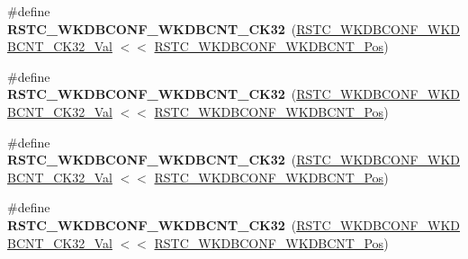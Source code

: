 \begin{DoxyCompactItemize}
\item 
\hypertarget{group___s_a_m_l21___r_s_t_c_ga48db58fd088481bbd3b6e4c97d285c78}{}\#define {\bfseries R\+S\+T\+C\+\_\+\+W\+K\+D\+B\+C\+O\+N\+F\+\_\+\+W\+K\+D\+B\+C\+N\+T\+\_\+C\+K32}~(\hyperlink{group___s_a_m_l21___r_s_t_c_gaa2aeafab04946b75150126bfb34a50db}{R\+S\+T\+C\+\_\+\+W\+K\+D\+B\+C\+O\+N\+F\+\_\+\+W\+K\+D\+B\+C\+N\+T\+\_\+C\+K32\+\_\+\+Val} $<$$<$ \hyperlink{group___s_a_m_l21___r_s_t_c_ga04802a267786aed951e1e31ab54ce6ad}{R\+S\+T\+C\+\_\+\+W\+K\+D\+B\+C\+O\+N\+F\+\_\+\+W\+K\+D\+B\+C\+N\+T\+\_\+\+Pos})\label{group___s_a_m_l21___r_s_t_c_ga48db58fd088481bbd3b6e4c97d285c78}

\item 
\hypertarget{group___s_a_m_l21___r_s_t_c_ga2f316556bdc6aa61a1c677333b56bc12}{}\#define {\bfseries R\+S\+T\+C\+\_\+\+W\+K\+D\+B\+C\+O\+N\+F\+\_\+\+W\+K\+D\+B\+C\+N\+T\+\_\+C\+K32}~(\hyperlink{group___s_a_m_l21___r_s_t_c_ga2c8394abff73e05170032f4b4aa5f0d5}{R\+S\+T\+C\+\_\+\+W\+K\+D\+B\+C\+O\+N\+F\+\_\+\+W\+K\+D\+B\+C\+N\+T\+\_\+C\+K32\+\_\+\+Val} $<$$<$ \hyperlink{group___s_a_m_l21___r_s_t_c_ga04802a267786aed951e1e31ab54ce6ad}{R\+S\+T\+C\+\_\+\+W\+K\+D\+B\+C\+O\+N\+F\+\_\+\+W\+K\+D\+B\+C\+N\+T\+\_\+\+Pos})\label{group___s_a_m_l21___r_s_t_c_ga2f316556bdc6aa61a1c677333b56bc12}

\item 
\hypertarget{group___s_a_m_l21___r_s_t_c_ga490746e665151d02238198a9b620e932}{}\#define {\bfseries R\+S\+T\+C\+\_\+\+W\+K\+D\+B\+C\+O\+N\+F\+\_\+\+W\+K\+D\+B\+C\+N\+T\+\_\+C\+K32}~(\hyperlink{group___s_a_m_l21___r_s_t_c_ga16fd49e34d93c9bdf781b8f5e21baf88}{R\+S\+T\+C\+\_\+\+W\+K\+D\+B\+C\+O\+N\+F\+\_\+\+W\+K\+D\+B\+C\+N\+T\+\_\+C\+K32\+\_\+\+Val} $<$$<$ \hyperlink{group___s_a_m_l21___r_s_t_c_ga04802a267786aed951e1e31ab54ce6ad}{R\+S\+T\+C\+\_\+\+W\+K\+D\+B\+C\+O\+N\+F\+\_\+\+W\+K\+D\+B\+C\+N\+T\+\_\+\+Pos})\label{group___s_a_m_l21___r_s_t_c_ga490746e665151d02238198a9b620e932}

\item 
\hypertarget{group___s_a_m_l21___r_s_t_c_ga2aaf864609945a7cbc07c5809e71f204}{}\#define {\bfseries R\+S\+T\+C\+\_\+\+W\+K\+D\+B\+C\+O\+N\+F\+\_\+\+W\+K\+D\+B\+C\+N\+T\+\_\+C\+K32}~(\hyperlink{group___s_a_m_l21___r_s_t_c_ga0c9da5e776fe21eb7a40d8dd300c8c12}{R\+S\+T\+C\+\_\+\+W\+K\+D\+B\+C\+O\+N\+F\+\_\+\+W\+K\+D\+B\+C\+N\+T\+\_\+C\+K32\+\_\+\+Val} $<$$<$ \hyperlink{group___s_a_m_l21___r_s_t_c_ga04802a267786aed951e1e31ab54ce6ad}{R\+S\+T\+C\+\_\+\+W\+K\+D\+B\+C\+O\+N\+F\+\_\+\+W\+K\+D\+B\+C\+N\+T\+\_\+\+Pos})\label{group___s_a_m_l21___r_s_t_c_ga2aaf864609945a7cbc07c5809e71f204}


\end{DoxyCompactItemize}
